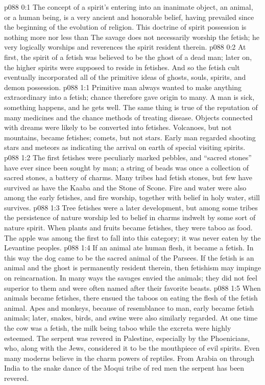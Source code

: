 \author{Brilliant Evening Star}
\vs p088 0:1 The concept of a spirit’s entering into an inanimate object, an animal, or a human being, is a very ancient and honorable belief, having prevailed since the beginning of the evolution of religion. This doctrine of spirit possession is nothing more nor less than  The savage does not necessarily worship the fetish; he very logically worships and reverences the spirit resident therein.\plusone
\vs p088 0:2 At first, the spirit of a fetish was believed to be the ghost of a dead man; later on, the higher spirits were supposed to reside in fetishes. And so the fetish cult eventually incorporated all of the primitive ideas of ghosts, souls, spirits, and demon possession.
\vs p088 1:1 Primitive man always wanted to make anything extraordinary into a fetish; chance therefore gave origin to many. A man is sick, something happens, and he gets well. The same thing is true of the reputation of many medicines and the chance methods of treating disease. Objects connected with dreams were likely to be converted into fetishes. Volcanoes, but not mountains, became fetishes; comets, but not stars. Early man regarded shooting stars and meteors as indicating the arrival on earth of special visiting spirits.
\vs p088 1:2 The first fetishes were peculiarly marked pebbles, and “sacred stones” have ever since been sought by man; a string of beads was once a collection of sacred stones, a battery of charms. Many tribes had fetish stones, but few have survived as have the Kaaba and the Stone of Scone. Fire and water were also among the early fetishes, and fire worship, together with belief in holy water, still survives.
\vs p088 1:3 Tree fetishes were a later development, but among some tribes the persistence of nature worship led to belief in charms indwelt by some sort of nature spirit. When plants and fruits became fetishes, they were taboo as food. The apple was among the first to fall into this category; it was never eaten by the Levantine peoples.
\vs p088 1:4 If an animal ate human flesh, it became a fetish. In this way the dog came to be the sacred animal of the Parsees. If the fetish is an animal and the ghost is permanently resident therein, then fetishism may impinge on reincarnation. In many ways the savages envied the animals; they did not feel superior to them and were often named after their favorite beasts.
\vs p088 1:5 When animals became fetishes, there ensued the taboos on eating the flesh of the fetish animal. Apes and monkeys, because of resemblance to man, early became fetish animals; later, snakes, birds, and swine were also similarly regarded. At one time the cow was a fetish, the milk being taboo while the excreta were highly esteemed. The serpent was revered in Palestine, especially by the Phoenicians, who, along with the Jews, considered it to be the mouthpiece of evil spirits. Even many moderns believe in the charm powers of reptiles. From Arabia on through India to the snake dance of the Moqui tribe of red men the serpent has been revered.
